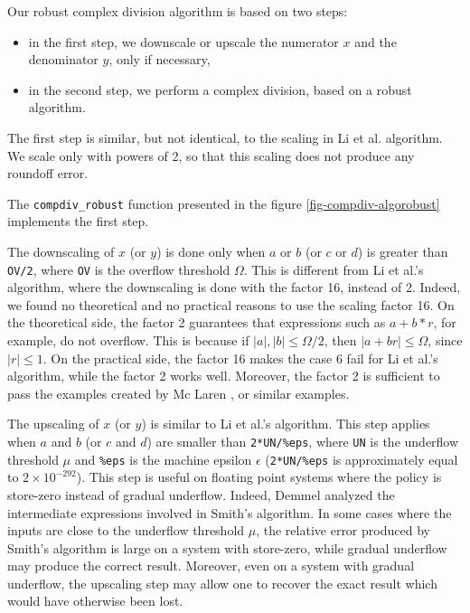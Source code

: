 \documentclass{paper}
\newcommand{\scivar}[1]{\texttt{#1}}
\begin{document}
Our robust complex division algorithm is based on two steps:
\begin{itemize}
\item in the first step, we downscale or upscale the numerator $x$ 
and the denominator $y$, only if necessary,
\item in the second step, we perform a complex division, based 
on a robust algorithm.
\end{itemize}

The first step is similar, but not identical, to the scaling 
in Li et al. algorithm. 
We scale only with powers of 2, so that this scaling does not 
produce any roundoff error. 

The \scivar{compdiv\_robust} function presented in the figure \ref{fig-compdiv-algorobust}
implements the first step.

The downscaling of $x$ (or $y$) is done only when 
$a$ or $b$ (or $c$ or $d$) is greater than \scivar{OV/2}, where 
\scivar{OV} is the overflow threshold $\Omega$. 
This is different from Li et al.'s algorithm, where the downscaling 
is done with the factor 16, instead of 2. 
Indeed, we found no theoretical and no practical reasons to 
use the scaling factor 16. 
On the theoretical side, the factor 2 guarantees that 
expressions such as $a+b*r$, for example, do not overflow. 
This is because if $|a|,|b|\leq \Omega/2$, then $|a+br|\leq \Omega$, 
since $|r|\leq 1$. 
On the practical side, the factor 16 makes the case 6 fail for 
Li et al.'s algorithm, while the factor 2 works well. 
Moreover, the factor 2 is sufficient to pass the examples created 
by Mc Laren \cite{McLaren2009}, or similar examples. 

The upscaling of $x$ (or $y$) is similar to Li et al.'s algorithm. 
This step applies when $a$ and $b$ (or $c$ and $d$) 
are smaller than \scivar{2*UN/\%eps}, where \scivar{UN} is the 
underflow threshold $\mu$ and \scivar{\%eps} is the machine epsilon $\epsilon$ 
(\scivar{2*UN/\%eps} is approximately equal to $2 \times 10^{-292}$). 
This step is useful on floating point systems where 
the policy is store-zero instead of gradual underflow. 
Indeed, Demmel analyzed \cite{Dem84,DemmelPC2011} the intermediate expressions 
involved in Smith's algorithm. 
In some cases where the inputs are close to the underflow threshold $\mu$, 
the relative error produced by Smith's algorithm is large on a 
system with store-zero, while gradual underflow may produce the 
correct result. 
Moreover, even on a system with gradual underflow, the upscaling step 
may allow one to recover the exact result which would have otherwise been lost. 
\end{document}
